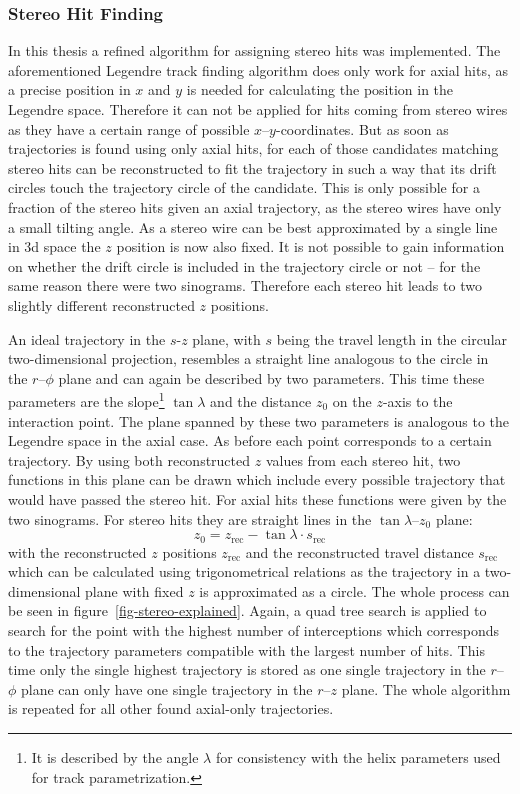 \subsubsection{Stereo Hit Finding}

In this thesis a refined algorithm for assigning stereo hits was implemented. The aforementioned Legendre track finding algorithm does only work for axial hits, as a precise position in $x$ and $y$ is needed for calculating the position in the Legendre space. Therefore it can not be applied for hits coming from stereo wires as they have a certain range of possible $x$--$y$-coordinates. But as soon as trajectories is found using only axial hits, for each of those candidates matching stereo hits can be reconstructed to fit the trajectory in such a way that its drift circles touch the trajectory circle of the candidate. This is only possible for a fraction of the stereo hits given an axial trajectory, as the stereo wires have only a small tilting angle. As a stereo wire can be best approximated by a single line in 3d space the $z$ position is now also fixed. It is not possible to gain information on whether the drift circle is included in the trajectory circle or not -- for the same reason there were two sinograms. Therefore each stereo hit leads to two slightly different reconstructed $z$ positions. 

An ideal trajectory in the $s$-$z$ plane, with $s$ being the travel length in the circular two-dimensional projection, resembles a straight line analogous to the circle in the $r$--$\phi$ plane and can again be described by two parameters. This time these parameters are the slope\footnote{It is described by the angle $\lambda$ for consistency with the helix parameters used for track parametrization.} $\tan \lambda$ and the distance $z_0$ on the $z$-axis to the interaction point. The plane spanned by these two parameters is analogous to the Legendre space in the axial case. As before each point corresponds to a certain trajectory. By using both reconstructed $z$ values from each stereo hit, two functions in this plane can be drawn which include every possible trajectory that would have passed the stereo hit. For axial hits these functions were given by the two sinograms. For stereo hits they are straight lines in the $\tan \lambda$--$z_0$ plane:
$$ z_0 = z_\text{rec} - \tan \lambda \cdot s_\text{rec} $$
with the reconstructed $z$ positions $z_\text{rec}$ and the reconstructed travel distance $s_\text{rec}$ which can be calculated using trigonometrical relations as the trajectory in a two-dimensional plane with fixed $z$ is approximated as a circle. The whole process can be seen in figure~\ref{fig-stereo-explained}. Again, a quad tree search is applied to search for the point with the highest number of interceptions which corresponds to the trajectory parameters compatible with the largest number of hits. This time only the single highest trajectory is stored as one single trajectory in the $r$--$\phi$ plane can only have one single trajectory in the $r$--$z$ plane. The whole algorithm is repeated for all other found axial-only trajectories. 

